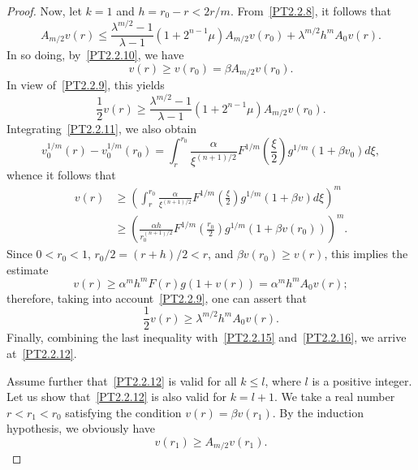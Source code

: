 \documentclass[11pt]{amsart}
\theoremstyle{definition}
\numberwithin{equation}{section}
\begin{document}
\begin{proof}
Now, let $k = 1$ and $h = r_0 - r < 2 r / m$.
From~\eqref{PT2.2.8}, it follows that
\begin{equation}
	A_{m / 2} v (r)
	\le
	\frac{
		\lambda^{m / 2} - 1
	}{
		\lambda - 1
	}
	(1 + 2^{n - 1} \mu)
	A_{m / 2} v (r_0)
	+
	\lambda^{m / 2}
	h^m
	A_0 v (r).
	\label{PT2.2.15}
\end{equation}
In so doing, by~\eqref{PT2.2.10}, we have
$$
	v (r) \ge v (r_0) = \beta A_{m / 2} v (r_0).
$$
In view of~\eqref{PT2.2.9}, this yields
\begin{equation}
	\frac{1}{2}
	v (r)
	\ge
	\frac{
		\lambda^{m / 2} - 1
	}{
		\lambda - 1
	}
	(1 + 2^{n - 1} \mu)
	A_{m / 2} v (r_0).
	\label{PT2.2.16}
\end{equation}
Integrating~\eqref{PT2.2.11}, we also obtain
$$
	v_0^{1 / m} (r) - v_0^{1 / m} (r_0)
	=
	\int_r^{r_0}
	\frac{
		\alpha
	}{
		\xi^{(n + 1) / 2}
	}
	F^{1 / m} 
	\left(
		\frac{\xi}{2}
	\right)
	g^{1 / m} (1 + \beta v_0)
	d\xi,
$$
whence it follows that
\begin{align*}
	v (r)
	&
	{}
	\ge
	\left(
		\int_r^{r_0}
		\frac{
			\alpha
		}{
			\xi^{(n + 1) / 2}
		}
		F^{1 / m} 
		\left(
			\frac{\xi}{2}
		\right)
		g^{1 / m} (1 + \beta v)
		d\xi
	\right)^m
	\\
	&
	{}
	\ge
	\left(
		\frac{
			\alpha 
			h
		}{
			r_0^{(n + 1) / 2}
		}
		F^{1 / m} 
		\left(
			\frac{r_0}{2}
		\right)
		g^{1 / m} (1 + \beta v (r_0))
	\right)^m.	
\end{align*}
Since $0 < r_0 < 1$, $r_0 / 2 = (r + h) / 2 < r$, and $\beta v (r_0) \ge v (r)$, this implies the estimate
$$
	v (r)
	\ge
	\alpha^m
	h^m
	F (r)
	g (1 + v (r))
	=
	\alpha^m
	h^m
	A_0 v (r);
$$
therefore, taking into account~\eqref{PT2.2.9}, one can assert that
\begin{equation}
	\frac{1}{2}
	v (r)
	\ge
	\lambda^{m / 2}
	h^m
	A_0 v (r).
	\label{PT2.2.17}
\end{equation}
Finally, combining the last inequality with~\eqref{PT2.2.15} and~\eqref{PT2.2.16}, we arrive at~\eqref{PT2.2.12}.

Assume further that~\eqref{PT2.2.12} is valid for all $k \le l$, where $l$ is a positive integer. Let us show that~\eqref{PT2.2.12} is also valid for $k = l + 1$. We take a real number $r < r_1 < r_0$ satisfying the condition $v (r) = \beta v (r_1)$.
By the induction hypothesis, we obviously have
\begin{equation}
	v (r_1) \ge A_{m / 2} v (r_1).
	\label{PT2.2.18}
\end{equation}


\end{proof}
\end{document}
